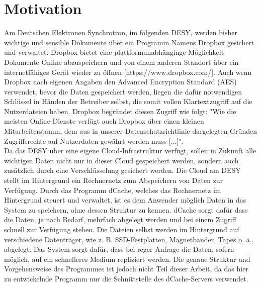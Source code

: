 \documentclass[10pt, a4paper]{scrreprt}
\begin{document}
\section{Motivation}
Am Deutschen Elektronen Synchrotron, im folgenden DESY, werden bisher wichtige und sensible Dokumente über ein Programm Namens Dropbox gesichert und verwaltet. Dropbox bietet eine plattformunabhänginge Möglichkeit Dokumente Online abzuspeichern und von einem anderen Standort über ein internetfähiges Gerät wieder zu öffnen [https://www.dropbox.com/]. Auch wenn Dropbox nach eigenen Angaben den Advanced Encryption Standard (AES)  verwendet, bevor die Daten gespeichert werden, liegen die dafür notwendigen Schlüssel in Händen der Betreiber selbst, die somit vollen Klartextzugriff auf die Nutzerdateien haben. Dropbox begründet diesen Zugriff wie folgt:  "Wie die meisten Online-Dienste verfügt auch Dropbox über einen kleinen Mitarbeiterstamm, dem aus in unserer Datenschutzrichtlinie dargelegten Gründen Zugriffsrechte auf Nutzerdaten gewährt werden muss [...]". \\ %
Da das DESY über eine eigene Cloud-Infrastruktur verfügt, sollen in Zukunft alle wichtigen Daten nicht nur in dieser Cloud gespeichert werden, sondern auch zusätzlich durch eine Verschlüsselung gesichert werden. Die Cloud am DESY stellt im Hintergrund ein Rechnernetz zum Abspeichern von Daten zur Verfügung. Durch das Programm dCache, welches das Rechnernetz im Hintergrund steuert und verwaltet, ist es dem Anwender möglich Daten in das System zu speichern, ohne dessen Struktur zu kennen. dCache sorgt dafür dass die Daten, je nach Bedarf, mehrfach abgelegt werden und bei einem Zugriff schnell zur Verfügung stehen. Die Dateien selbst werden im Hintergrund auf verschiedene Datenträger, wie z. B. SSD-Festplatten, Magnetbänder, Tapes o. ä., abgelegt. Das System sorgt dafür, dass bei reger Anfrage die Daten, sofern möglich, auf ein schnelleres Medium repliziert werden. Die genaue Struktur und Vorgehensweise des Programmes ist jedoch nicht Teil dieser Arbeit, da das hier zu entwickelnde Programm nur die Schnittstelle des dCache-Servers verwendet.
\end{document}
